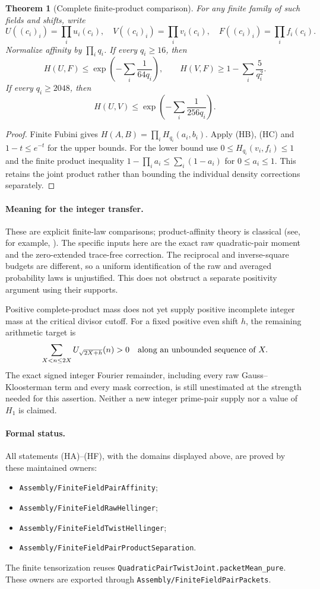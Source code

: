\documentclass[11pt]{article}
\newtheorem{theorem}{Theorem}[section]
\begin{document}
\begin{theorem}[Complete finite-product comparison]
For any finite family of such fields and shifts, write
\[
 U((c_i)_i)=\prod_i u_i(c_i),\quad
 V((c_i)_i)=\prod_i v_i(c_i),\quad
 F((c_i)_i)=\prod_i f_i(c_i).
\]
Normalize affinity by \(\prod_i q_i\). If every \(q_i\ge16\), then
\[
 H(U,F)\le
   \exp\left(-\sum_i\frac1{64q_i}\right),\qquad
 H(V,F)\ge1-\sum_i\frac5{q_i^2}.
 \tag{HE}
\]
If every \(q_i\ge2048\), then
\[
 H(U,V)\le
   \exp\left(-\sum_i\frac1{256q_i}\right).
 \tag{HF}
\]
\end{theorem}
\begin{proof}
Finite Fubini gives \(H(A,B)=\prod_i H_{q_i}(a_i,b_i)\).
Apply (HB), (HC) and \(1-t\le e^{-t}\) for the upper bounds.
For the lower bound use \(0\le H_{q_i}(v_i,f_i)\le1\) and the
finite product inequality
\(1-\prod_i a_i\le\sum_i(1-a_i)\) for \(0\le a_i\le1\).
This retains the joint product rather than bounding the individual
density corrections separately.
\end{proof}

\paragraph{Meaning for the integer transfer.}
These are explicit finite-law comparisons; product-affinity theory is
classical (see, for example, \cite{KudoKakutani}). The specific inputs
here are the exact raw quadratic-pair moment and the zero-extended
trace-free correction. The reciprocal and inverse-square budgets are
different, so a uniform identification of the raw and averaged
probability laws is unjustified. This does not obstruct a separate
positivity argument using their supports.

Positive complete-product mass does not yet supply positive incomplete
integer mass at the critical divisor cutoff. For a fixed positive even
shift \(h\), the remaining arithmetic target is
\[
 \sum_{X<n\le2X}U_{\sqrt{2X+h}}(n)>0
 \quad\hbox{along an unbounded sequence of }X.
\]
The exact signed integer Fourier remainder, including every raw
Gauss--Kloosterman term and every mask correction, is still unestimated
at the strength needed for this assertion. Neither a new integer
prime-pair supply nor a value of \(H_1\) is claimed.

\paragraph{Formal status.}
All statements (HA)--(HF), with the domains displayed above, are proved
by these maintained owners:
\begin{itemize}
\item \texttt{Assembly/FiniteFieldPairAffinity};
\item \texttt{Assembly/FiniteFieldRawHellinger};
\item \texttt{Assembly/FiniteFieldTwistHellinger};
\item \texttt{Assembly/FiniteFieldPairProductSeparation}.
\end{itemize}
The finite tensorization reuses
\texttt{QuadraticPairTwistJoint.packetMean\_pure}.
These owners are exported through \texttt{Assembly/FiniteFieldPairPackets}.
\end{document}
